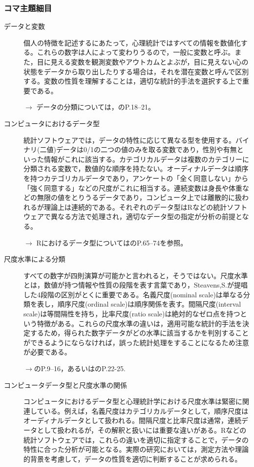 \subsubsection{コマ主題細目}
\begin{description}
	\item[データと変数] 個人の特徴を記述するにあたって，心理統計ではすべての情報を数値化する。これらの数字は人によって変わりうるので，一般に変数と呼ぶ。また，目に見える変数を観測変数やアウトカムとよぶが，目に見えない心の状態をデータから取り出したりする場合は，それを潜在変数と呼んで区別する。変数の性質を理解することは，適切な統計的手法を選択する上で重要である。
	      \begin{flushright}
		      $\to$ データの分類については，\textcite{Yamada2004}のP.18--21。
	      \end{flushright}

	\item[コンピュータにおけるデータ型] 統計ソフトウェアでは，データの特性に応じて異なる型を使用する。バイナリ(二値)データは0/1の二つの値のみを取る変数であり，性別や有無といった情報がこれに該当する。カテゴリカルデータは複数のカテゴリーに分類される変数で，数値的な順序を持たない。オーディナルデータは順序を持つカテゴリカルデータであり，アンケートの「全く同意しない」から「強く同意する」などの尺度がこれに相当する。連続変数は身長や体重などの無限の値をとりうるデータであり，コンピュータ上では離散的に扱われるが理論上は連続的である。それぞれのデータ型はRなどの統計ソフトウェアで異なる方法で処理され，適切なデータ型の指定が分析の前提となる。
	      \begin{flushright}
		      $\to$ Rにおけるデータ型については\textcite{Baba2020}のP.65--74を参照。
	      \end{flushright}

	\item[尺度水準による分類] すべての数字が四則演算が可能かと言われると，そうではない。尺度水準とは，数値が持つ情報や性質の段階を表す言葉であり，Steavens,S.が提唱した4段階の区別がとくに重要である。名義尺度(nominal scale)は単なる分類を表し，順序尺度(ordinal scale)は順序関係を表す。間隔尺度(interval scale)は等間隔性を持ち，比率尺度(ratio scale)は絶対的なゼロ点を持つという特徴がある。これらの尺度水準の違いは，適用可能な統計的手法を決定するため，得られた数字データがどの水準に該当するかを判別することができるようにならなければ，誤った統計処理をすることになるため注意が必要である。
	      \begin{flushright}
		      $\to$\textcite{Kawabata201408}のP.9--16，あるいは\textcite{Yamada2004}のP.22-25.
	      \end{flushright}

	\item[コンピュータデータ型と尺度水準の関係] コンピュータにおけるデータ型と心理統計学における尺度水準は緊密に関連している。例えば，名義尺度はカテゴリカルデータとして，順序尺度はオーディナルデータとして扱われる。間隔尺度と比率尺度は通常，連続データとして扱われるが，その解釈と扱いには重要な違いがある。Rなどの統計ソフトウェアでは，これらの違いを適切に指定することで，データの特性に合った分析が可能となる。実際の研究においては，測定方法や理論的背景を考慮して，データの性質を適切に判断することが求められる。

\end{description}

